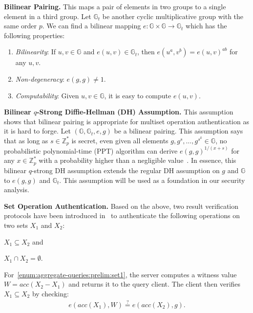 \textbf{Bilinear Pairing.} This maps a pair of elements in two groups to a single element in a third group. Let $\mathbb{G}_{t}$ be another cyclic multiplicative group with the same order $p$. We can find a bilinear mapping $e: \mathbb{G} \times \mathbb{G} \rightarrow \mathbb{G}_t$ which has the following properties:
\begin{enumerate}
  \item \emph{Bilinearity}: If $u, v \in \mathbb{G}$ and $e(u,v)\in\mathbb{G}_t$, then $e(u^{a}, v^{b}) = e{(u, v)}^{ab}$ for any $u,v$.
  \item \emph{Non-degeneracy}: $e(g, g) \neq 1$.
  \item \emph{Computability}: Given $u,v\in \mathbb{G}$, it is easy to compute $e(u, v)$.
\end{enumerate}

\textbf{Bilinear $q$-Strong Diffie-Hellman (DH) Assumption.} This assumption shows that bilinear pairing is appropriate for multiset operation authentication as it is hard to forge. Let $(\mathbb{G}, \mathbb{G}_t, e, g)$ be a bilinear pairing. This assumption says that as long as $s\in \mathbb{Z}_p^*$ is secret, even given all elements $g, g^s, \dots, g^{s^k} \in \mathbb{G}$, no probabilistic polynomial-time (PPT) algorithm can derive ${e(g,g)}^{1/(x+s)}$ for any $x\in \mathbb{Z}_p^*$ with a probability higher than a negligible value~\cite{10.1007/978-3-540-28628-8_3}. In essence, this bilinear $q$-strong DH assumption extends the regular DH assumption on $g$ and $\mathbb{G}$ to $e(g,g)$ and $\mathbb{G}_t$. This assumption will be used as a foundation in our security analysis.

\textbf{Set Operation Authentication.} Based on the above, two result verification protocols have been introduced in~\cite{10.1007/978-3-642-54631-0_7,10.1007/978-3-642-22792-9_6} to authenticate the following operations on two sets $X_1$ and $X_2$:
\begin{inlineenum}
\item $X_1 \subseteq X_2$ and~\label{enum:aggregate-queries:prelim:set1}
\item $X_1 \cap X_2 = \emptyset$.~\label{enum:aggregate-queries:prelim:set2}
\end{inlineenum}

For~\ref{enum:aggregate-queries:prelim:set1}, the server computes a witness value $W = acc(X_2 - X_1)$ and returns it to the query client. The client then verifies $X_1 \subseteq X_2$ by checking:
\begin{align*}
  e(acc(X_1), W) \stackrel{?}{=} e(acc(X_2), g).
\end{align*}

